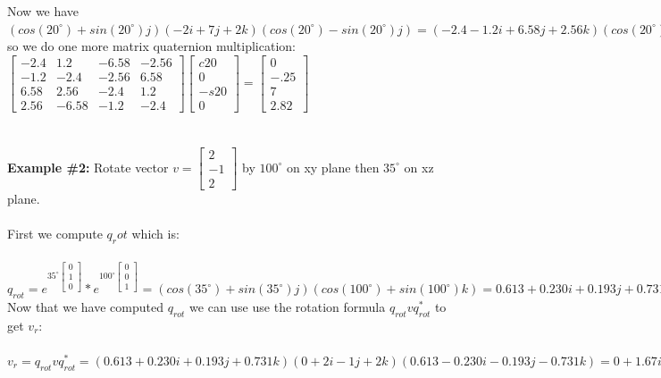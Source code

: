 \documentclass{article}
\begin{document}
Now we have $(cos(20^\circ)+sin(20^\circ)j) (-2i+7j+2k) (cos(20^\circ)-sin(20^\circ)j)=(-2.4-1.2i+6.58j+2.56k)(cos(20^\circ)-sin(20^\circ)j)$ so we do one more matrix quaternion multiplication:\\
$\begin{bmatrix}
-2.4 & 1.2 & -6.58 & -2.56\\
-1.2 & -2.4 & -2.56 & 6.58\\
 6.58 & 2.56 & -2.4 & 1.2\\
 2.56 & -6.58 &  -1.2 & -2.4 
\end{bmatrix}\begin{bmatrix}
c20\\
0\\
-s20\\
0
\end{bmatrix}=\begin{bmatrix}
0\\
-.25\\
7\\
2.82
\end{bmatrix}$\\\\\\
\textbf{Example \#2: } Rotate vector $v=\begin{bmatrix}
2\\
-1\\
2
\end{bmatrix}$ by $100^\circ$ on xy plane then $35^\circ$ on xz plane.\\\\
First we compute $q_rot$ which is:\\\\ 
$q_{rot}=e^{35^\circ\begin{bmatrix}
0\\
1\\
0
\end{bmatrix}}*e^{100^\circ\begin{bmatrix}
0\\
0\\
1
\end{bmatrix}}=(cos(35^\circ)+sin(35^\circ)j)(cos(100^\circ)+sin(100^\circ)k)=0.613 +0.230i +0.193j +0.731k$\\
Now that we have computed $q_{rot}$ we can use use the rotation formula $q_{rot}vq_{rot}^*$ to get $v_r$:\\\\
$v_r=q_{rot}vq_{rot}^*=(0.613 +0.230i +0.193j +0.731k)(0+2i-1j+2k)(0.613 -0.230i -0.193j -0.731k)=0+1.67i+2.14j+1.27k$\\\\
\end{document}
